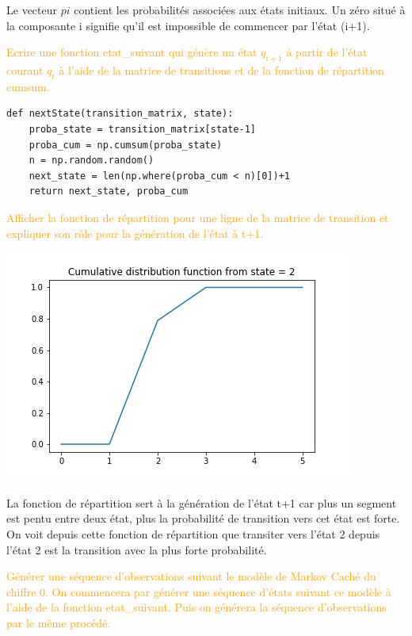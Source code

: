 \documentclass[11pt,a4paper,fleqn]{article}
\begin{document}
Le vecteur $pi$ contient les probabilités associées aux états initiaux. Un zéro situé à la composante i signifie qu'il est impossible de commencer par l'état (i+1).

\vspace{5mm}
\textcolor{orange}{Ecrire une fonction etat\_suivant qui génère un état $q_{t+1}$ à partir de l’état courant $q_t$ à l’aide de la matrice de transitions et de la fonction de répartition cumsum.}

\lstset{language=Python}
\lstset{frame=lines}
\lstset{basicstyle=\footnotesize}
\begin{lstlisting}
def nextState(transition_matrix, state):
    proba_state = transition_matrix[state-1]
    proba_cum = np.cumsum(proba_state)
    n = np.random.random()
    next_state = len(np.where(proba_cum < n)[0])+1
    return next_state, proba_cum
\end{lstlisting}

\vspace{5mm}
\textcolor{orange}{Afficher la fonction de répartition pour une ligne de la matrice de transition et expliquer son rôle pour la génération de l’état à t+1.}

\begin{center}
\includegraphics[scale = 0.5]{cdf_part_2.jpeg}
\end{center}

La fonction de répartition sert à la génération de l'état t+1 car plus un segment est pentu entre deux état, plus la probabilité de transition vers cet état est forte. On voit depuis cette fonction de répartition que transiter vers l'état 2 depuis l'état 2 est la transition avec la plus forte probabilité.

\vspace{5mm}
\textcolor{orange}{Générer une séquence d’observations suivant le modèle de Markov Caché du chiffre 0. On commencera par générer une séquence d’états suivant ce modèle à l’aide de la fonction etat\_suivant. Puis on générera la séquence d’observations par le même procédé.}
\end{document}

